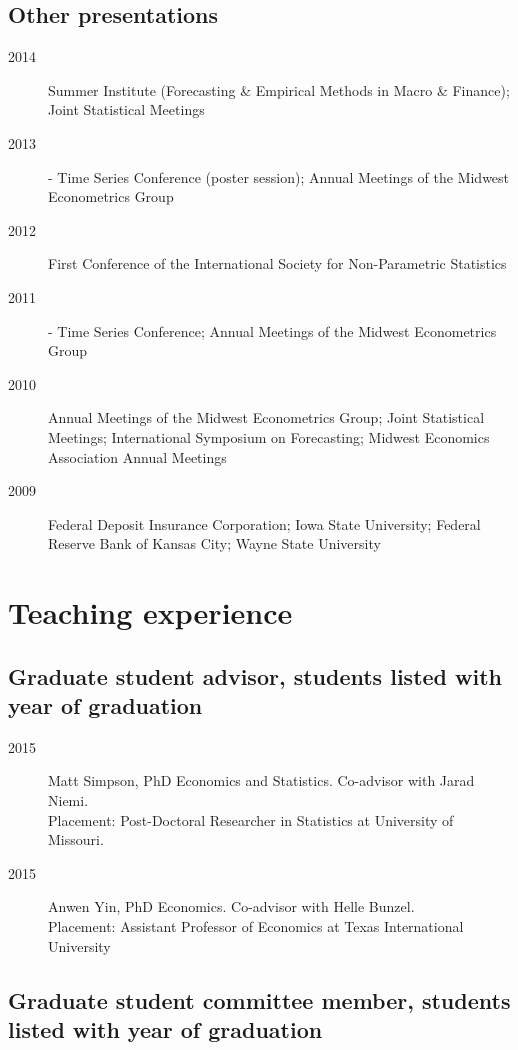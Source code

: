 \documentclass[12pt]{article}%
\newcommand{\allcaps}[1]{\textls{\MakeUppercase{#1}}}
\begin{document}
\subsection*{Other presentations}
\begin{description}
\item[2014] \allcaps{NBER} Summer Institute (Forecasting \& Empirical Methods in
  Macro \& Finance); Joint Statistical Meetings
\item[2013] \allcaps{NBER}-\allcaps{NSF} Time Series Conference
  (poster session); Annual Meetings of the Midwest Econometrics Group
\item[2012] First Conference of the International Society for
  Non-Parametric Statistics
\item[2011] \allcaps{NBER}-\allcaps{NSF} Time Series Conference;
  Annual Meetings of the Midwest Econometrics Group
\item[2010] Annual Meetings of the Midwest Econometrics Group; Joint
  Statistical Meetings; International Symposium on Forecasting;
  Midwest Economics Association Annual Meetings
\item[2009] Federal Deposit Insurance Corporation; Iowa State
  University; Federal Reserve Bank of Kansas City; Wayne State
  University
\end{description}

\section*{Teaching experience}

\subsection*{Graduate student advisor, students listed with year of graduation}
\begin{description}
\item[2015] Matt Simpson, PhD Economics and Statistics.  Co-advisor
with Jarad Niemi. \\
Placement: Post-Doctoral Researcher in Statistics at University of Missouri.
\item[2015] Anwen Yin, PhD Economics. Co-advisor with Helle Bunzel. \\
Placement: Assistant Professor of Economics at Texas 
International University
\end{description}

\subsection*{Graduate student committee member, students listed with year of graduation}
\end{document}
